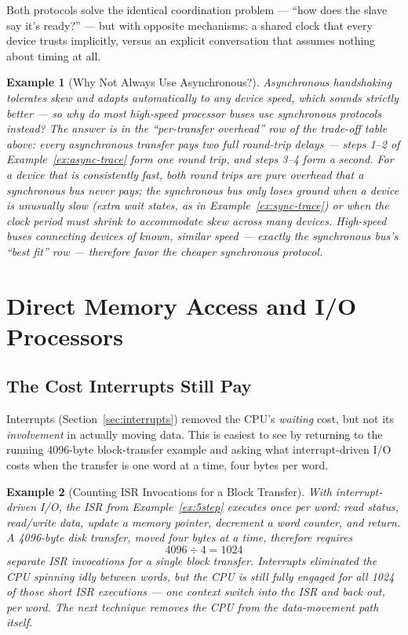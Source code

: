 \documentclass[11pt]{article}
\newtheorem{example}{Example}[section]
\begin{document}
Both protocols solve the identical coordination problem --- ``how does the slave say it's ready?'' --- but with opposite mechanisms: a shared clock that every device trusts implicitly, versus an explicit conversation that assumes nothing about timing at all.

\begin{example}[Why Not Always Use Asynchronous?]
\label{ex:why-sync}
Asynchronous handshaking tolerates skew and adapts automatically to any device speed, which sounds strictly better --- so why do most high-speed processor buses use synchronous protocols instead? The answer is in the ``per-transfer overhead'' row of the trade-off table above: every asynchronous transfer pays \emph{two full round-trip delays} --- steps 1--2 of Example~\ref{ex:async-trace} form one round trip, and steps 3--4 form a second. For a device that is consistently fast, both round trips are pure overhead that a synchronous bus never pays; the synchronous bus only loses ground when a device is unusually slow (extra wait states, as in Example~\ref{ex:sync-trace}) or when the clock period must shrink to accommodate skew across many devices. High-speed buses connecting devices of known, similar speed --- exactly the synchronous bus's ``best fit'' row --- therefore favor the cheaper synchronous protocol.
\end{example}

\section{Direct Memory Access and I/O Processors}
\label{sec:dma}

\subsection{The Cost Interrupts Still Pay}

Interrupts (Section~\ref{sec:interrupts}) removed the CPU's \emph{waiting} cost, but not its \emph{involvement} in actually moving data. This is easiest to see by returning to the running 4096-byte block-transfer example and asking what interrupt-driven I/O costs when the transfer is one word at a time, four bytes per word.

\begin{example}[Counting ISR Invocations for a Block Transfer]
\label{ex:isr-count}
With interrupt-driven I/O, the ISR from Example~\ref{ex:5step} executes once per word: read status, read/write data, update a memory pointer, decrement a word counter, and return. A 4096-byte disk transfer, moved four bytes at a time, therefore requires
\[
4096 \div 4 = 1024
\]
separate ISR invocations for a \emph{single} block transfer. Interrupts eliminated the CPU spinning idly between words, but the CPU is still fully engaged for all 1024 of those short ISR executions --- one context switch into the ISR and back out, per word. The next technique removes the CPU from the data-movement path itself.
\end{example}
\end{document}
